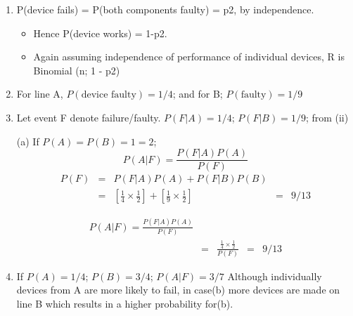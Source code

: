 \documentclass[a4paper,12pt]{article}
\begin{document}
\begin{enumerate}
    \item P(device fails) = P(both components faulty) = p2, by independence.
    
\begin{itemize}
    \item Hence P(device works) =
1-p2. 
\item Again assuming independence of performance of individual devices, R is Binomial
(n; 1 - p2)
\end{itemize}
\item For line A, $P(\mbox{device faulty}) = 1/4$; and for B; $P(\mbox{faulty}) = 1/9$
\item  Let event F denote failure/faulty.
$P(F|A) = 1/4$; $P(F|B) = 1/9$; from (ii)

(a) If $P(A) = P(B) = 1=2$; 
\[P(A|F) = \frac{P(F|A)P(A)}{P(F)}\] 
\begin{eqnarray*}
P(F) &=&  P(F|A)P(A)+P(F|B)P(B) \\ 
&=& \left[\frac{1}{4} \times \frac{1}{2} \right] + \left[\frac{1}{9} \times \frac{1}{2} \right] 
&=& 9/13
\end{eqnarray*}

\begin{eqnarray*}
P(A|F) = \frac{P(F|A)P(A)}{P(F)} \\ 
&=& \frac{\frac{1}{4} \times \frac{1}{2}}{P(F)}
&=& 9/13
\end{eqnarray*}

\item  If $P(A) = 1/4$; $P(B) = 3/4$; $P(A|F) = 3/7$
Although individually devices from A are more likely to fail, in case(b) more devices
are made on line B which results in a higher probability for(b).
\end{enumerate}
\end{document}
